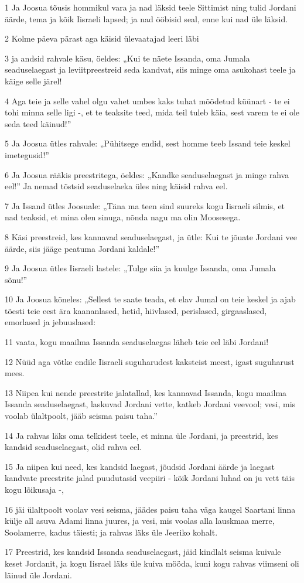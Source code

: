 \par 1 Ja Joosua tõusis hommikul vara ja nad läksid teele Sittimist ning tulid Jordani äärde, tema ja kõik Iisraeli lapsed; ja nad ööbisid seal, enne kui nad üle läksid.
\par 2 Kolme päeva pärast aga käisid ülevaatajad leeri läbi
\par 3 ja andsid rahvale käsu, öeldes: „Kui te näete Issanda, oma Jumala seaduselaegast ja leviitpreestreid seda kandvat, siis minge oma asukohast teele ja käige selle järel!
\par 4 Aga teie ja selle vahel olgu vahet umbes kaks tuhat mõõdetud küünart - te ei tohi minna selle ligi -, et te teaksite teed, mida teil tuleb käia, sest varem te ei ole seda teed käinud!”
\par 5 Ja Joosua ütles rahvale: „Pühitsege endid, sest homme teeb Issand teie keskel imetegusid!”
\par 6 Ja Joosua rääkis preestritega, öeldes: „Kandke seaduselaegast ja minge rahva eel!” Ja nemad tõstsid seaduselaeka üles ning käisid rahva eel.
\par 7 Ja Issand ütles Joosuale: „Täna ma teen sind suureks kogu Iisraeli silmis, et nad teaksid, et mina olen sinuga, nõnda nagu ma olin Moosesega.
\par 8 Käsi preestreid, kes kannavad seaduselaegast, ja ütle: Kui te jõuate Jordani vee äärde, siis jääge peatuma Jordani kaldale!”
\par 9 Ja Joosua ütles Iisraeli lastele: „Tulge siia ja kuulge Issanda, oma Jumala sõnu!”
\par 10 Ja Joosua kõneles: „Sellest te saate teada, et elav Jumal on teie keskel ja ajab tõesti teie eest ära kaananlased, hetid, hiivlased, perislased, girgaaslased, emorlased ja jebuuslased:
\par 11 vaata, kogu maailma Issanda seaduselaegas läheb teie eel läbi Jordani!
\par 12 Nüüd aga võtke endile Iisraeli suguharudest kaksteist meest, igast suguharust mees.
\par 13 Niipea kui nende preestrite jalatallad, kes kannavad Issanda, kogu maailma Issanda seaduselaegast, laskuvad Jordani vette, katkeb Jordani veevool; vesi, mis voolab ülaltpoolt, jääb seisma paisu taha.”
\par 14 Ja rahvas läks oma telkidest teele, et minna üle Jordani, ja preestrid, kes kandsid seaduselaegast, olid rahva eel.
\par 15 Ja niipea kui need, kes kandsid laegast, jõudsid Jordani äärde ja laegast kandvate preestrite jalad puudutasid veepiiri - kõik Jordani luhad on ju vett täis kogu lõikusaja -,
\par 16 jäi ülaltpoolt voolav vesi seisma, jäädes paisu taha väga kaugel Saartani linna külje all asuva Adami linna juures, ja vesi, mis voolas alla lauskmaa merre, Soolamerre, kadus täiesti; ja rahvas läks üle Jeeriko kohalt.
\par 17 Preestrid, kes kandsid Issanda seaduselaegast, jäid kindlalt seisma kuivale keset Jordanit, ja kogu Iisrael läks üle kuiva mööda, kuni kogu rahvas viimseni oli läinud üle Jordani.

